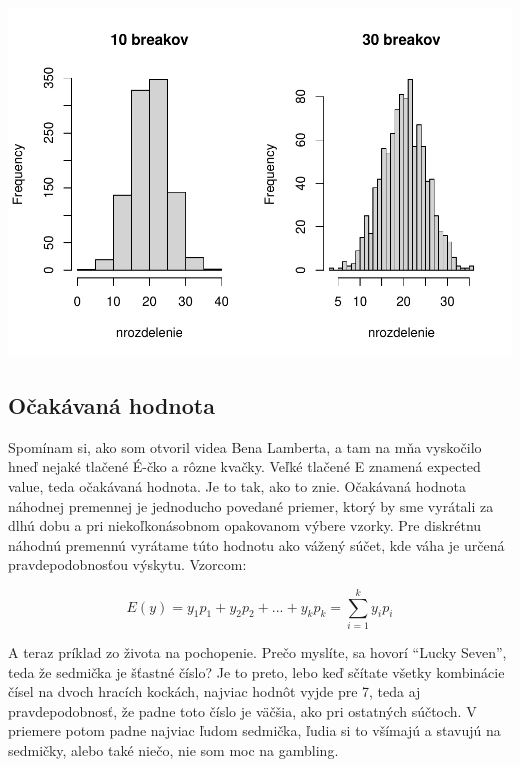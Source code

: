 \includegraphics{test_files/figure-latex/unnamed-chunk-44-1.pdf}

\begin{Shaded}
\begin{Highlighting}[]
\end{Highlighting}
\end{Shaded}

\hypertarget{oux10dakuxe1vanuxe1-hodnota}{%
\subsection{Očakávaná hodnota}\label{oux10dakuxe1vanuxe1-hodnota}}

Spomínam si, ako som otvoril videa Bena Lamberta, a tam na mňa vyskočilo
hneď nejaké tlačené É-čko a rôzne kvačky. Veľké tlačené E znamená
expected value, teda očakávaná hodnota. Je to tak, ako to znie.
Očakávaná hodnota náhodnej premennej je jednoducho povedané priemer,
ktorý by sme vyrátali za dlhú dobu a pri niekoľkonásobnom opakovanom
výbere vzorky. Pre diskrétnu náhodnú premennú vyrátame túto hodnotu ako
vážený súčet, kde váha je určená pravdepodobnosťou výskytu. Vzorcom:

\[E(y)= y_1p_1 + y_2p_2 + ... + y_kp_k = \sum_{i=1}^{k}y_ip_i\]

A teraz príklad zo života na pochopenie. Prečo myslíte, sa hovorí
``Lucky Seven'', teda že sedmička je šťastné číslo? Je to preto, lebo
keď sčítate všetky kombinácie čísel na dvoch hracích kockách, najviac
hodnôt vyjde pre 7, teda aj pravdepodobnosť, že padne toto číslo je
väčšia, ako pri ostatných súčtoch. V priemere potom padne najviac ľudom
sedmička, ľudia si to všímajú a stavujú na sedmičky, alebo také niečo,
nie som moc na gambling.

